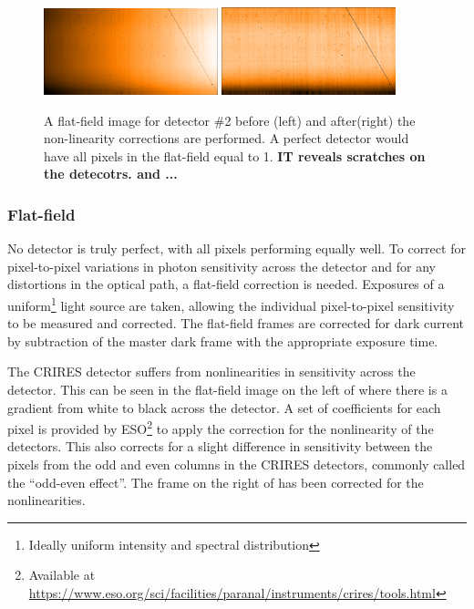 \begin{figure}[h]
    \centering
        \includegraphics[width=0.45\textwidth]{figures/reduction/Flat_2.png} %
          \includegraphics[width=0.45\textwidth]{figures/reduction/FlatR_2.png} %
    \caption{A flat-field image for detector \#2 before (left) and after(right) the non-linearity corrections are performed. A perfect detector would have all pixels in the flat-field equal to 1. \bf{\red IT reveals scratches on the detecotrs. and ...}}
    \label{fig:masterflats}
\end{figure}


\subsubsection{Flat-field}
No detector is truly perfect, with all pixels performing equally well. To correct for pixel-to-pixel variations in photon sensitivity across the detector and for any distortions in the optical path, a flat-field correction is needed. Exposures of a uniform\footnote{Ideally uniform intensity and spectral distribution} light source are taken, allowing the individual pixel-to-pixel sensitivity to be measured and corrected. The flat-field frames are corrected for dark current by subtraction of the master dark frame with the appropriate exposure time.

The CRIRES detector suffers from nonlinearities in sensitivity across the detector. This can be seen in the flat-field image on the left of  where there is a gradient from white to black across the detector. A set of coefficients for each pixel is provided by ESO\footnote{Available at \href{https://www.eso.org/sci/facilities/paranal/instruments/crires/tools.html}{https://www.eso.org/sci/facilities/paranal/instruments/crires/tools.html}} to apply the correction for the nonlinearity of the detectors. This also corrects for a slight difference in sensitivity between the pixels from the odd and even columns in the CRIRES detectors, commonly called the ``odd-even effect''. The frame on the right of  has been corrected for the nonlinearities.

